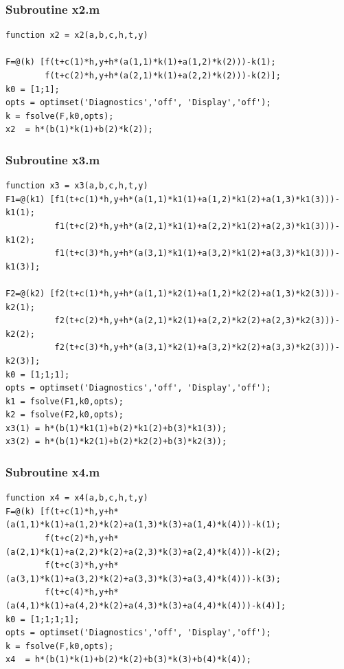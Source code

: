 \documentclass[a4paper,oneside]{book}
\numberwithin{equation}{chapter}
\begin{document}
\subsubsection{Subroutine x2.m}
\begin{verbatim}
function x2 = x2(a,b,c,h,t,y)

F=@(k) [f(t+c(1)*h,y+h*(a(1,1)*k(1)+a(1,2)*k(2)))-k(1);
        f(t+c(2)*h,y+h*(a(2,1)*k(1)+a(2,2)*k(2)))-k(2)];
k0 = [1;1];
opts = optimset('Diagnostics','off', 'Display','off');
k = fsolve(F,k0,opts);
x2  = h*(b(1)*k(1)+b(2)*k(2));
\end{verbatim}
\subsubsection{Subroutine x3.m}
\begin{verbatim}
function x3 = x3(a,b,c,h,t,y)
F1=@(k1) [f1(t+c(1)*h,y+h*(a(1,1)*k1(1)+a(1,2)*k1(2)+a(1,3)*k1(3)))-k1(1);
          f1(t+c(2)*h,y+h*(a(2,1)*k1(1)+a(2,2)*k1(2)+a(2,3)*k1(3)))-k1(2);
          f1(t+c(3)*h,y+h*(a(3,1)*k1(1)+a(3,2)*k1(2)+a(3,3)*k1(3)))-k1(3)];
 
F2=@(k2) [f2(t+c(1)*h,y+h*(a(1,1)*k2(1)+a(1,2)*k2(2)+a(1,3)*k2(3)))-k2(1);
          f2(t+c(2)*h,y+h*(a(2,1)*k2(1)+a(2,2)*k2(2)+a(2,3)*k2(3)))-k2(2);
          f2(t+c(3)*h,y+h*(a(3,1)*k2(1)+a(3,2)*k2(2)+a(3,3)*k2(3)))-k2(3)];     
k0 = [1;1;1]; 
opts = optimset('Diagnostics','off', 'Display','off');
k1 = fsolve(F1,k0,opts);
k2 = fsolve(F2,k0,opts);
x3(1) = h*(b(1)*k1(1)+b(2)*k1(2)+b(3)*k1(3));
x3(2) = h*(b(1)*k2(1)+b(2)*k2(2)+b(3)*k2(3));
\end{verbatim}
\subsubsection{Subroutine x4.m}
\begin{verbatim}
function x4 = x4(a,b,c,h,t,y)
F=@(k) [f(t+c(1)*h,y+h*(a(1,1)*k(1)+a(1,2)*k(2)+a(1,3)*k(3)+a(1,4)*k(4)))-k(1);
        f(t+c(2)*h,y+h*(a(2,1)*k(1)+a(2,2)*k(2)+a(2,3)*k(3)+a(2,4)*k(4)))-k(2);
        f(t+c(3)*h,y+h*(a(3,1)*k(1)+a(3,2)*k(2)+a(3,3)*k(3)+a(3,4)*k(4)))-k(3);
        f(t+c(4)*h,y+h*(a(4,1)*k(1)+a(4,2)*k(2)+a(4,3)*k(3)+a(4,4)*k(4)))-k(4)];
k0 = [1;1;1;1]; 
opts = optimset('Diagnostics','off', 'Display','off');
k = fsolve(F,k0,opts);
x4  = h*(b(1)*k(1)+b(2)*k(2)+b(3)*k(3)+b(4)*k(4));
\end{verbatim}
\end{document}
